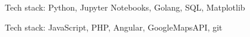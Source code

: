 \documentclass[letterpaper]{resume}
\begin{document}
\begin{compactitem}
\item Tech stack: Python, Jupyter Notebooks, Golang, SQL, Matplotlib
\end{compactitem}

\begin{compactitem}
\item Tech stack: JavaScript, PHP, Angular, GoogleMapsAPI, git
\end{compactitem}

\end{document}
